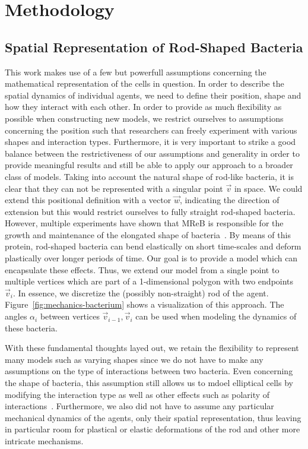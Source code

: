 \documentclass{article}
\begin{document}

\section{Methodology}
\subsection{Spatial Representation of Rod-Shaped Bacteria}
This work makes use of a few but powerfull assumptions concerning the mathematical representation of
the cells in question.
In order to describe the spatial dynamics of individual agents, we need to define their position,
shape and how they interact with each other.
In order to provide as much flexibility as possible when constructing new models, we restrict
ourselves to assumptions concerning the position such that researchers can freely experiment with
various shapes and interaction types.
Furthermore, it is very important to strike a good balance between the restrictiveness of our
assumptions and generality in order to provide meaningful results and still be able to apply our
approach to a broader class of models.
Taking into account the natural shape of rod-like bacteria, it is clear that they can not be
represented with a singular point $\vec{v}$ in space.
We could extend this positional definition with a vector $\vec{w}$, indicating the direction of
extension but this would restrict ourselves to fully straight rod-shaped bacteria.
However, multiple experiments have shown that MReB is responsible for the growth and maintenance of
the elongated shape of bacteria~\cite{Erickson2001}.
By means of this protein, rod-shaped bacteria can bend elastically on short time-scales and
deform plastically over longer periods of time.
Our goal is to provide a model which can encapsulate these effects.
Thus, we extend our model from a single point to multiple vertices which are part of a 1-dimensional
polygon with two endpoints $\vec{v}_i$.
In essence, we discretize the (possibly non-straight) rod of the agent.
Figure~\ref{fig:mechanics-bacterium} shows a visualization of this approach.
The angles $\alpha_i$ between vertices $\vec{v}_{i-1},\vec{v}_i$ can be used when modeling the
dynamics of these bacteria.

With these fundamental thoughts layed out, we retain the flexibility to represent many models such
as varying shapes since we do not have to make any assumptions on the type of interactions between
two bacteria.
Even concerning the shape of bacteria, this assumption still allows us to mdoel elliptical cells by
modifying the interaction type as well as other effects such as polarity of
interactions~\cite{Duvernoy2018}.
Furthermore, we also did not have to assume any particular mechanical dynamics of the agents, only
their spatial representation, thus leaving in particular room for plastical or elastic deformations
of the rod and other more intricate mechanisms.
\end{document}
